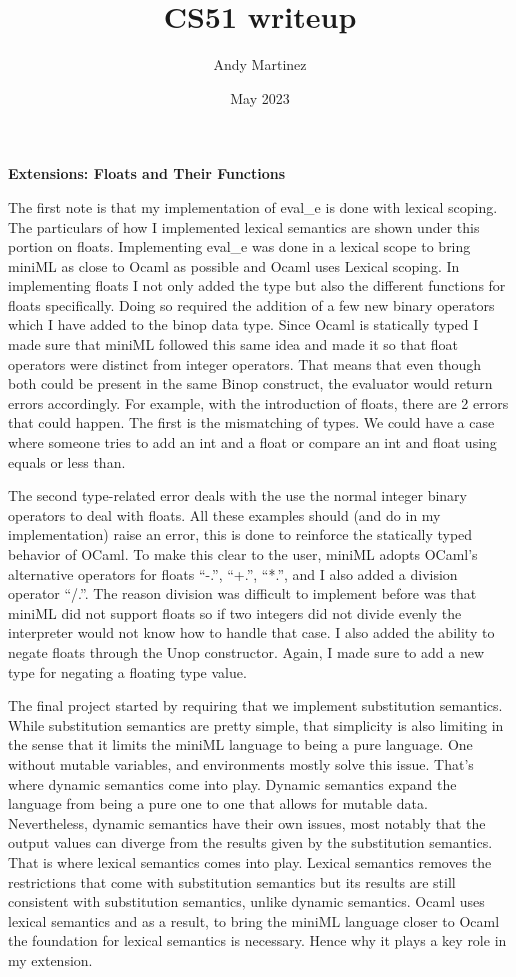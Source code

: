 \documentclass[12pt]{article}
\title{CS51 writeup}
\author{Andy Martinez}
\date{May 2023}
\begin{document}
\maketitle
\textbf{Extensions: Floats and Their Functions}

The first note is that my implementation of eval\_e is done with lexical scoping. The particulars of how I implemented lexical semantics are shown under this portion on floats. Implementing eval\_e was done in a lexical scope to bring miniML as close to Ocaml as possible and Ocaml uses Lexical scoping. In implementing floats I not only added the type but also the different functions for floats specifically. Doing so required the addition of a few new binary operators which I have added to the binop data type. Since Ocaml is statically typed I made sure that miniML followed this same idea and made it so that float operators were distinct from integer operators. That means that even though both could be present in the same Binop construct, the evaluator would return errors accordingly. For example, with the introduction of floats, there are 2 errors that could happen. The first is the mismatching of types. We could have a case where someone tries to add an int and a float or compare an int and float using equals or less than. 

The second type-related error deals with the use the normal integer binary operators to deal with floats. All these examples should (and do in my implementation) raise an error, this is done to reinforce the statically typed behavior of OCaml. To make this clear to the user, miniML adopts OCaml's alternative operators for floats “-.”, “+.”, “*.”, and I also added a division operator “/.”. The reason division was difficult to implement before was that miniML did not support floats so if two integers did not divide evenly the interpreter would not know how to handle that case. I also added the ability to negate floats through the Unop constructor. Again, I made sure to add a new type for negating a floating type value. 
\pagebreak


The final project started by requiring that we implement substitution semantics. While substitution semantics are pretty simple, that simplicity is also limiting in the sense that it limits the miniML language to being a pure language. One without mutable variables, and environments mostly solve this issue. That's where dynamic semantics come into play. Dynamic semantics expand the language from being a pure one to one that allows for mutable data. Nevertheless, dynamic semantics have their own issues, most notably that the output values can diverge from the results given by the substitution semantics. That is where lexical semantics comes into play. Lexical semantics removes the restrictions that come with substitution semantics but its results are still consistent with substitution semantics, unlike dynamic semantics. Ocaml uses lexical semantics and as a result, to bring the miniML language closer to Ocaml the foundation for lexical semantics is necessary. Hence why it plays a key role in my extension.
\end{document}
